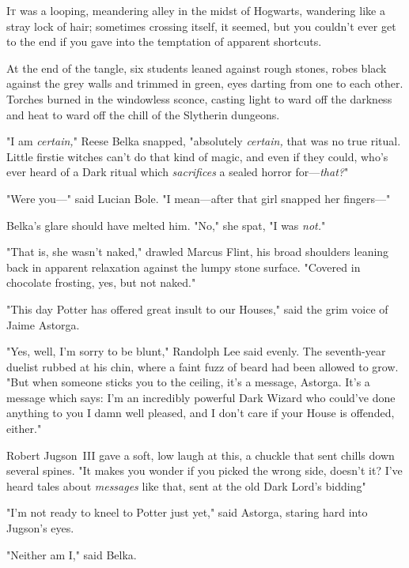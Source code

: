 
\lettrine{I}{t} was a looping,
meandering alley in the midst of Hogwarts, wandering like a stray lock of hair;
sometimes crossing itself, it seemed, but you couldn't ever get to the end if
you gave into the temptation of apparent shortcuts.

At the end of the tangle, six students leaned against rough stones, robes black
against the grey walls and trimmed in green, eyes darting from one to each
other. Torches burned in the windowless sconce, casting light to ward off the
darkness and heat to ward off the chill of the Slytherin dungeons.

"I am \emph{certain,}" Reese Belka snapped, "absolutely \emph{certain,} that
was no true ritual. Little firstie witches can't do that kind of magic, and
even if they could, who's ever heard of a Dark ritual which \emph{sacrifices} a
sealed horror for---\emph{that?}"

"Were you\mbox{---}" said Lucian Bole. "I mean---after that girl snapped her
fingers\mbox{---}"

Belka's glare should have melted him. "No," she spat, "I was \emph{not.}"

"That is, she wasn't naked," drawled Marcus Flint, his broad shoulders leaning
back in apparent relaxation against the lumpy stone surface. "Covered in
chocolate frosting, yes, but not naked."

"This day Potter has offered great insult to our Houses," said the grim voice
of Jaime Astorga.

"Yes, well, I'm sorry to be blunt," Randolph Lee said evenly. The seventh-year
duelist rubbed at his chin, where a faint fuzz of beard had been allowed to
grow. "But when someone sticks you to the ceiling, it's a message, Astorga.
It's a message which says: I'm an incredibly powerful Dark Wizard who could've
done anything to you I damn well pleased, and I don't care if your House is
offended, either."

Robert Jugson~III gave a soft, low laugh at this, a chuckle that sent chills
down several spines. "It makes you wonder if you picked the wrong side, doesn't
it? I've heard tales about \emph{messages} like that, sent at the old Dark
Lord's bidding{\el}"

"I'm not ready to kneel to Potter just yet," said Astorga, staring hard into
Jugson's eyes.

"Neither am I," said Belka.


